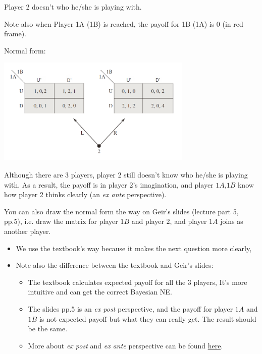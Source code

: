 \documentclass{article}
\begin{document}
\begin{mdframed}[backgroundcolor=blue!20,linecolor=white]
Player 2 doesn't who he/she is playing with.
\vspace{2mm}

Note also when Player 1A (1B) is reached, the payoff for 1B (1A) is 0 (in red frame).
\end{mdframed}


\vspace{4mm}

Normal form:

\begin{center}
\includegraphics[width=0.7\textwidth]{9.q26_3_b2}
\end{center}
\vspace{2mm}

\begin{mdframed}[backgroundcolor=blue!20,linecolor=white]
Although there are 3 players, player 2 still doesn't know who he/she is playing with. As a result, the payoff is in player 2's imagination, and player $1A$,$1B$ know how player 2 thinks clearly (an \textit{ex ante} perspective).

\medskip

You can also draw the normal form the way on Geir's slides (lecture part 5, pp.5), i.e. draw
the matrix for player $1B$ and player $2$, and player $1A$ joins as another player. 

\begin{itemize}
\item We use the textbook's way because it makes the next question more clearly,
\item Note also the difference between the textbook and Geir's slides:
\begin{itemize}

\item The textbook calculates expected payoff for all the 3 players,  It's more intuitive and can get the correct Bayesian NE.

\item The slides pp.5 is an \textit{ex post} perspective, and the payoff for player $1A$ and $1B$ is not expected payoff but what they can really get. The result should be the same.

\item More about \textit{ex post} and \textit{ex ante} perspective can be found \href{https://www.cs.toronto.edu/~cebly/2534/Notes/CSC2534_Lecture9.pdf}{here}.
\end{itemize}

\end{itemize}

\end{mdframed}
\end{document}
